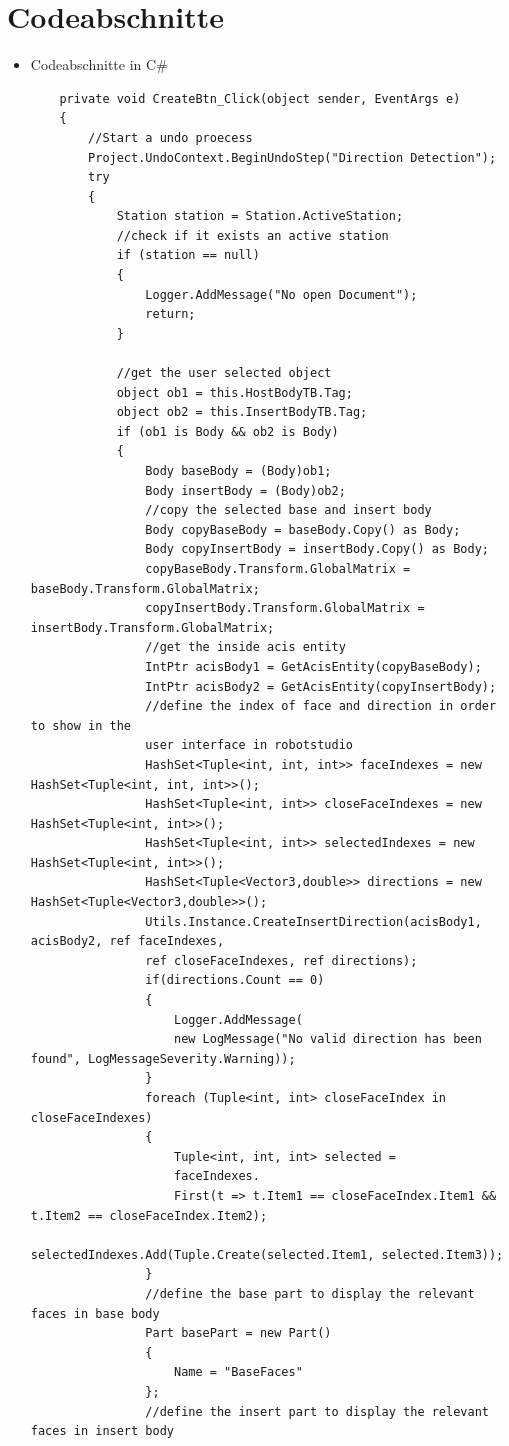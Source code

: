 \documentclass[14pt,a4paper,titlepage]{article}
\begin{document}
	\section*{Codeabschnitte}
	\begin{itemize}
		\item Codeabschnitte in C\#	
	\begin{lstlisting}
	private void CreateBtn_Click(object sender, EventArgs e)
	{
		//Start a undo proecess
		Project.UndoContext.BeginUndoStep("Direction Detection");
		try
		{
			Station station = Station.ActiveStation;
			//check if it exists an active station
			if (station == null)
			{
				Logger.AddMessage("No open Document");
				return;
			}
		
			//get the user selected object
			object ob1 = this.HostBodyTB.Tag;
			object ob2 = this.InsertBodyTB.Tag;
			if (ob1 is Body && ob2 is Body)
			{
				Body baseBody = (Body)ob1;
				Body insertBody = (Body)ob2;
				//copy the selected base and insert body
				Body copyBaseBody = baseBody.Copy() as Body;
				Body copyInsertBody = insertBody.Copy() as Body;
				copyBaseBody.Transform.GlobalMatrix = baseBody.Transform.GlobalMatrix;
				copyInsertBody.Transform.GlobalMatrix = insertBody.Transform.GlobalMatrix;
				//get the inside acis entity
				IntPtr acisBody1 = GetAcisEntity(copyBaseBody);
				IntPtr acisBody2 = GetAcisEntity(copyInsertBody);
				//define the index of face and direction in order to show in the
				user interface in robotstudio
				HashSet<Tuple<int, int, int>> faceIndexes = new HashSet<Tuple<int, int, int>>();
				HashSet<Tuple<int, int>> closeFaceIndexes = new HashSet<Tuple<int, int>>();
				HashSet<Tuple<int, int>> selectedIndexes = new HashSet<Tuple<int, int>>();
				HashSet<Tuple<Vector3,double>> directions = new HashSet<Tuple<Vector3,double>>();
				Utils.Instance.CreateInsertDirection(acisBody1, acisBody2, ref faceIndexes,
				ref closeFaceIndexes, ref directions);
				if(directions.Count == 0)
				{
					Logger.AddMessage(
					new LogMessage("No valid direction has been found", LogMessageSeverity.Warning));
				}
				foreach (Tuple<int, int> closeFaceIndex in closeFaceIndexes)
				{
					Tuple<int, int, int> selected =
					faceIndexes.
					First(t => t.Item1 == closeFaceIndex.Item1 && t.Item2 == closeFaceIndex.Item2);
					selectedIndexes.Add(Tuple.Create(selected.Item1, selected.Item3));
				}
				//define the base part to display the relevant faces in base body
				Part basePart = new Part()
				{
					Name = "BaseFaces"
				};
				//define the insert part to display the relevant faces in insert body

\end{lstlisting}
\end{itemize}
\end{document}
